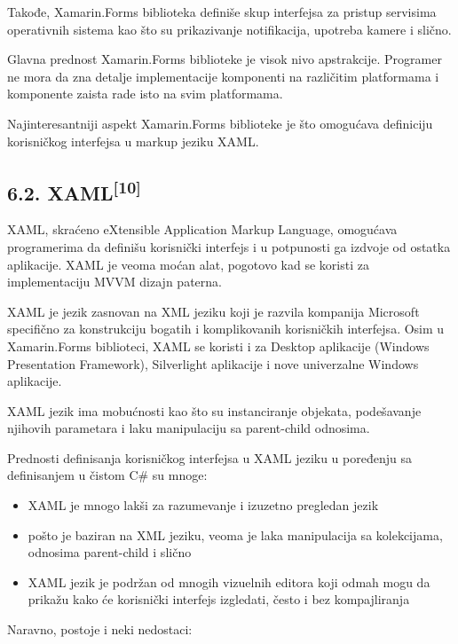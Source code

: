 \documentclass[a4paper]{article}
\newcommand\liststyleLv{%
\renewcommand\labelitemi{•}
\renewcommand\labelitemii{◦}
\renewcommand\labelitemiii{${\blacksquare}$}
\renewcommand\labelitemiv{•}
}
\begin{document}
Takođe, Xamarin.Forms biblioteka definiše skup interfejsa za pristup
servisima operativnih sistema kao što su prikazivanje notifikacija,
upotreba kamere i slično.

Glavna prednost Xamarin.Forms biblioteke je visok nivo apstrakcije.
Programer ne mora da zna detalje implementacije komponenti na
različitim platformama i komponente zaista rade isto na svim
platformama.

Najinteresantniji aspekt Xamarin.Forms biblioteke je što omogućava
definiciju korisničkog interfejsa u markup jeziku XAML.

\subsection[6.2. XAML[10{]}]{6.2. XAML\textsuperscript{[10]}}
\hypertarget{RefHeadingToc1452255603686}{}XAML, skraćeno eXtensible
Application Markup Language, omogućava programerima da definišu
korisnički interfejs i u potpunosti ga izdvoje od ostatka aplikacije.
XAML je veoma moćan alat, pogotovo kad se koristi za implementaciju
MVVM dizajn paterna.

XAML je jezik zasnovan na XML jeziku koji je razvila kompanija Microsoft
specifično za konstrukciju bogatih i komplikovanih korisničkih
interfejsa. Osim u Xamarin.Forms biblioteci, XAML se koristi i za
Desktop aplikacije (Windows Presentation Framework), Silverlight
aplikacije i nove univerzalne Windows aplikacije.

XAML jezik ima mobućnosti kao što su instanciranje objekata, podešavanje
njihovih parametara i laku manipulaciju sa parent-child odnosima.

Prednosti definisanja korisničkog interfejsa u XAML jeziku u poređenju
sa definisanjem u čistom C\# su mnoge:

\liststyleLv
\begin{itemize}
\item XAML je mnogo lakši za razumevanje i izuzetno pregledan jezik
\item pošto je baziran na XML jeziku, veoma je laka manipulacija sa
kolekcijama, odnosima parent-child i slično
\item XAML jezik je podržan od mnogih vizuelnih editora koji odmah mogu
da prikažu kako će korisnički interfejs izgledati, često i bez
kompajliranja
\end{itemize}
Naravno, postoje i neki nedostaci:
\end{document}
